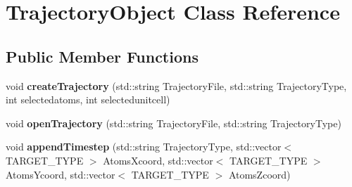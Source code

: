 \hypertarget{classTrajectoryObject}{}\section{Trajectory\+Object Class Reference}
\label{classTrajectoryObject}
\subsection*{Public Member Functions}
\begin{DoxyCompactItemize}
\item 
void {\bfseries create\+Trajectory} (std\+::string Trajectory\+File, std\+::string Trajectory\+Type, int selectedatoms, int selectedunitcell)\hypertarget{classTrajectoryObject_a24310ba2376f1a8208f769971c369b17}{}\label{classTrajectoryObject_a24310ba2376f1a8208f769971c369b17}

\item 
void {\bfseries open\+Trajectory} (std\+::string Trajectory\+File, std\+::string Trajectory\+Type)\hypertarget{classTrajectoryObject_adf379b178374742c75a50d3df6cb8d18}{}\label{classTrajectoryObject_adf379b178374742c75a50d3df6cb8d18}

\item 
void {\bfseries append\+Timestep} (std\+::string Trajectory\+Type, std\+::vector$<$ T\+A\+R\+G\+E\+T\+\_\+\+T\+Y\+PE $>$ Atoms\+Xcoord, std\+::vector$<$ T\+A\+R\+G\+E\+T\+\_\+\+T\+Y\+PE $>$ Atoms\+Ycoord, std\+::vector$<$ T\+A\+R\+G\+E\+T\+\_\+\+T\+Y\+PE $>$ Atoms\+Zcoord)\hypertarget{classTrajectoryObject_a8affa98ca416262dd078bd52fd78c9e2}{}\label{classTrajectoryObject_a8affa98ca416262dd078bd52fd78c9e2}

\end{DoxyCompactItemize}
